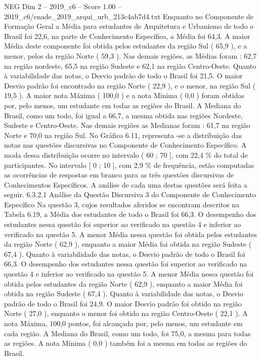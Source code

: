 \begin{textsample}{NEG Dim 2 – 2019\_c6 – Score 1.00 – 2019\_c6/enade\_2019\_arqui\_urb\_213c4ab7d4.txt}
Enquanto no Componente de Formação Geral a Média para estudantes de Arquitetura e Urbanismo de todo o Brasil foi 22,6, na parte de Conhecimento Específico, a Média foi 64,3.
A maior Média deste componente foi obtida pelos estudantes da região Sul ( 65,9 ), e a menor, pelos da região Norte ( 59,3 ).
Nas demais regiões, as Médias foram : 62,7 na região nordeste, 65,5 na região Sudeste e 62,1 na região Centro-Oeste.
Quanto à variabilidade das notas, o Desvio padrão de todo o Brasil foi 21,5.
O maior Desvio padrão foi encontrado na região Norte ( 22,9 ), e o menor, na região Sul ( 19,5 ).
A maior nota Máxima ( 100,0 ) e a nota Mínima ( 0,0 ) foram obtidas por, pelo menos, um estudante em todas as regiões do Brasil.
A Mediana do Brasil, como um todo, foi igual a 66,7, a mesma obtida nas regiões Nordeste, Sudeste e Centro-Oeste.
Nas demais regiões as Medianas foram : 61,7 na região Norte e 70,0 na região Sul.
No Gráfico 6.11, representa -se a distribuição das notas nas questões discursivas no Componente de Conhecimento Específico.
A moda dessa distribuição ocorre no intervalo ( 60 ; 70 ], com 22,4 \% do total de participantes.
No intervalo [ 0 ; 10 ], com 2,9 \% de frequência, estão computadas as ocorrências de respostas em branco para as três questões discursivas de Conhecimentos Específicos.
A análise de cada uma destas questões será feita a seguir. 6.3.2.1 Análise da Questão Discursiva 3 do Componente de Conhecimento Específico Na questão 3, cujos resultados aferidos se encontram descritos na Tabela 6.19, a Média dos estudantes de todo o Brasil foi 66,3.
O desempenho dos estudantes nessa questão foi superior ao verificado na questão 4 e inferior ao verificado na questão 5.
A menor Média nessa questão foi obtida pelos estudantes da região Norte ( 62,9 ), enquanto a maior Média foi obtida na região Sudeste ( 67,4 ).
Quanto à variabilidade das notas, o Desvio padrão de todo o Brasil foi 66,3.
O desempenho dos estudantes nessa questão foi superior ao verificado na questão 4 e inferior ao verificado na questão 5.
A menor Média nessa questão foi obtida pelos estudantes da região Norte ( 62,9 ), enquanto a maior Média foi obtida na região Sudeste ( 67,4 ).
Quanto à variabilidade das notas, o Desvio padrão de todo o Brasil foi 24,9.
O maior Desvio padrão foi obtido na região Norte ( 27,0 ), enquanto o menor foi obtido na região Centro-Oeste ( 22,1 ).
A nota Máxima, 100,0 pontos, foi alcançada por, pelo menos, um estudante em cada região.
A Mediana do Brasil, como um todo, foi 75,0, a mesma para todas as regiões.
A nota Mínima ( 0,0 ) também foi a mesma em todas as regiões do Brasil.

\end{textsample}
